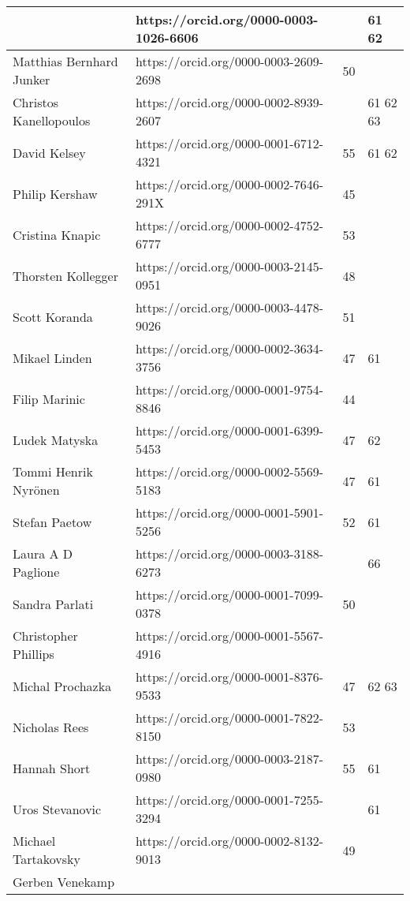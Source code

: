 \begin{center}
\begin{longtable}{|p{5cm}|C{6cm}|C{2cm}|C{2.5cm}|}
&https://orcid.org/0000-0003-1026-6606
&
&61 62\\
\hline
Matthias Bernhard Junker
&https://orcid.org/0000-0003-2609-2698
&50
&\\
\hline
Christos Kanellopoulos
&https://orcid.org/0000-0002-8939-2607
&
&61 62 63\\
\hline
David Kelsey
&https://orcid.org/0000-0001-6712-4321
&55
&61 62\\
\hline
Philip Kershaw
&https://orcid.org/0000-0002-7646-291X
&45
&\\
\hline
Cristina Knapic
&https://orcid.org/0000-0002-4752-6777
&53
&\\
\hline
Thorsten Kollegger
&https://orcid.org/0000-0003-2145-0951
&48
&\\
\hline
Scott Koranda
&https://orcid.org/0000-0003-4478-9026
&51
&\\
\hline
Mikael Linden
&https://orcid.org/0000-0002-3634-3756
&47
&61\\
\hline
Filip Marinic
&https://orcid.org/0000-0001-9754-8846
&44
&\\
\hline
Ludek Matyska
&https://orcid.org/0000-0001-6399-5453
&47
&62\\
\hline
Tommi Henrik Nyr\"{o}nen
&https://orcid.org/0000-0002-5569-5183
&47
&61\\
\hline
Stefan Paetow
&https://orcid.org/0000-0001-5901-5256
&52
&61\\
\hline
Laura A D Paglione
&https://orcid.org/0000-0003-3188-6273
&
&66\\
\hline
Sandra Parlati
&https://orcid.org/0000-0001-7099-0378
&50
&\\
\hline
Christopher Phillips
&https://orcid.org/0000-0001-5567-4916
&
&\\
\hline
Michal Prochazka
&https://orcid.org/0000-0001-8376-9533
&47
&62 63\\
\hline
Nicholas Rees
&https://orcid.org/0000-0001-7822-8150
&53
&\\
\hline
Hannah Short
&https://orcid.org/0000-0003-2187-0980
&55
&61\\
\hline
Uros Stevanovic
&https://orcid.org/0000-0001-7255-3294
&
&61\\
\hline
Michael Tartakovsky
&https://orcid.org/0000-0002-8132-9013
&49
&\\
\hline
Gerben Venekamp

\end{longtable}
\end{center}
